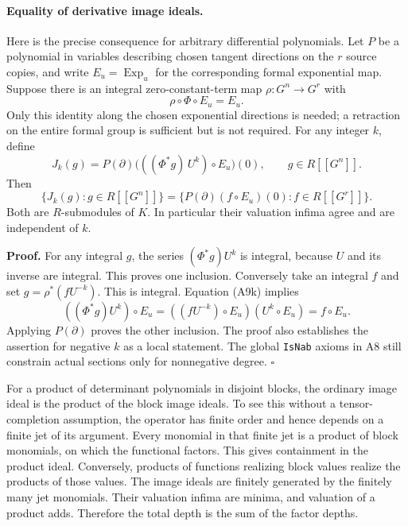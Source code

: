 \documentclass[11pt]{article}
\theoremstyle{definition}\newtheorem{definition}[theorem]{Definition}\newtheorem{remark}[theorem]{Remark}
\begin{document}
\paragraph{Equality of derivative image ideals.}
Here is the precise consequence for arbitrary differential
polynomials.  Let $P$ be a polynomial in variables describing
chosen tangent directions on the $r$ source copies, and write
$E_u=\operatorname{Exp}_u$ for the corresponding formal
exponential map.  Suppose there is an integral zero-constant-term
map $\rho:G^n\to G^r$ with
\[
                   \rho\circ\Phi\circ E_u=E_u.
 \tag{A9k}
\]
Only this identity along the chosen exponential directions is
needed; a retraction on the entire formal group is sufficient
but is not required.  For any integer $k$, define
\[
 J_k(g)
   =P(\partial)\bigl(((\Phi^*g)\,U^k)
                         \circ E_u\bigr)(0),
          \qquad g\in R[[G^n]].
 \tag{A9l}
\]
Then
\[
 \{J_k(g):g\in R[[G^n]]\}
   =\{P(\partial)(f\circ E_u)(0):f\in R[[G^r]]\}.
 \tag{A9m}
\]
Both are $R$-submodules of $K$.  In particular their
valuation infima agree and are independent of $k$.

\textbf{Proof.}
For any integral $g$, the series
$(\Phi^*g)U^k$ is integral, because $U$ and its inverse are
integral.  This proves one inclusion.
Conversely take an integral $f$ and set
$g=\rho^*(fU^{-k})$.  This is integral.  Equation (A9k) implies
\[
 ((\Phi^*g)U^k)\circ E_u
   =((fU^{-k})\circ E_u)(U^k\circ E_u)
   =f\circ E_u.
 \]
Applying $P(\partial)$ proves the other inclusion.
The proof also establishes the assertion for negative $k$
as a local statement.  The global \texttt{IsNab} axioms in A8
still constrain actual sections only for nonnegative degree.
\hfill$\square$

For a product of determinant polynomials in disjoint blocks,
the ordinary image ideal is the product of the block image
ideals.  To see this without a tensor-completion assumption,
the operator has finite order and hence depends on a finite
jet of its argument.  Every monomial in that finite jet is a
product of block monomials, on which the functional factors.
This gives containment in the product ideal.  Conversely,
products of functions realizing block values realize the
products of those values.  The image ideals are finitely
generated by the finitely many jet monomials.  Their valuation
infima are minima, and valuation of a product adds.  Therefore
the total depth is the sum of the factor depths.
\end{document}
